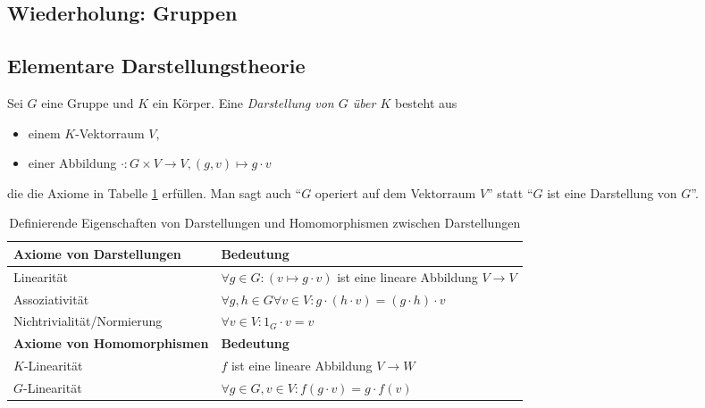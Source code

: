 \subsection{Wiederholung: Gruppen}


\subsection{Elementare Darstellungstheorie}

\begin{definition}[Darstellungen]\label{darstellungen:def}
Sei $G$ eine Gruppe und $K$ ein Körper. Eine \emph{Darstellung von $G$ über $K$} besteht aus
\begin{itemize}
	\item einem $K$-Vektorraum $V$,
	\item einer Abbildung $\cdot: G \times V \to V, (g,v) \mapsto g\cdot v$
\end{itemize}
die die Axiome in Tabelle \ref{darstellungen:def_table} erfüllen. Man sagt auch \enquote{$G$ operiert auf dem Vektorraum $V$} statt \enquote{$G$ ist eine Darstellung von $G$}.

\begin{table}[!ht]
	\setlength\extrarowheight{10pt} %
	\begin{tabularx}{\textwidth}{p{7cm} X}
		
		\toprule
		\textbf{Axiome von Darstellungen}                    & \textbf{Bedeutung} \\
		\midrule
        \hspace{1cm}Linearität                               & $\forall g\in G: (v\mapsto g\cdot v)$ ist eine lineare Abbildung $V\to V$ \\
		\hspace{1cm}Assoziativität                           & $\forall g,h\in G\forall v\in V: g\cdot (h\cdot v)=(g\cdot h)\cdot v$  \\
		\hspace{1cm}Nichtrivialität/Normierung               & $\forall v\in V: 1_G\cdot v=v$  \\
		\textbf{Axiome von Homomorphismen}                   & \textbf{Bedeutung} \\
        \midrule
        \hspace{1cm}$K$-Linearität & $f$ ist eine lineare Abbildung $V\to W$ \\
        \hspace{1cm}$G$-Linearität & $\forall g\in G, v\in V: f(g\cdot v) = g\cdot f(v)$ \\
        \bottomrule
	\end{tabularx}
	\caption{Definierende Eigenschaften von Darstellungen und Homomorphismen zwischen Darstellungen}
    \label{darstellungen:def_table}
\end{table}


\end{definition}
